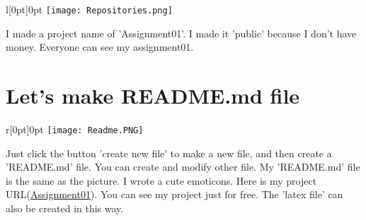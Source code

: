 \documentclass[10pt]{article} %
\begin{document}
\begin{minipage}[t]{.60\linewidth}
\begin{wrapfigure}[6]{l}[0pt]{0pt}
\texttt{[image: Repositories.png]}
\end{wrapfigure}
I made a project name of 'Assignment01'. I made it 'public' because I don't have money. Everyone can see my assignment01.\\

\section{\label{sec:level3}{\large Let's make README.md file}}
\begin{wrapfigure}[10]{r}[0pt]{0pt}
\texttt{[image: Readme.PNG]}
\end{wrapfigure}
Just click the button 'create new file' to make a new file, and then create a 'README.md' file. You can create and modify other file. My 'README.md' file is the same as the picture. I wrote a cute emoticons. Here is my project URL(\href{https://github.com/SojeongAn/Assignment01}{Assignment01}). You can see my project just for free. The 'latex file' can also be created in this way.\\
\end{minipage}
\end{document}
